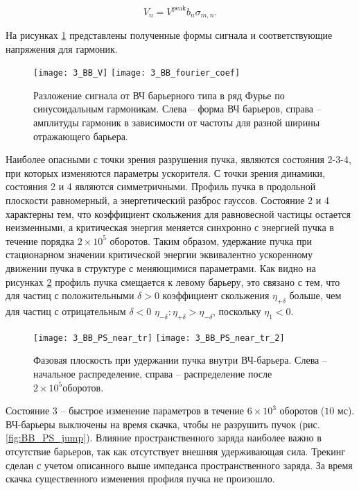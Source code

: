 \begin{equation}
V_n=V^{\textrm{peak}}b_n\sigma_{m, n}.
\label{Volt_n}
\end{equation}

\noindent На рисунках \ref{fig:wave} представлены полученные формы сигнала и со\-от\-вет\-ству\-ющ\-ие напряжения для гармоник.

\begin{figure}[!h]
   \texttt{[image: 3\_BB\_V]}
   \texttt{[image: 3\_BB\_fourier\_coef]}
   \caption{Разложение сигнала от ВЧ барьерного типа в ряд Фурье по синусоидальным гармоникам. Слева – форма 
   ВЧ барьеров, справа – амплитуды гармоник в зависимости от частоты для разной ширины отражающего барьера.}
   \label{fig:wave}
\end{figure}

\par Наиболее опасными с точки зрения разрушения пучка, являются со\-сто\-я\-ния 2-3-4, при которых изменяются параметры ускорителя. С точки зрения динамики, состояния 2 и 4 являются симметричными. Профиль пучка в продольной плоскости равномерный, а э\-нер\-ге\-ти\-чес\-кий разброс гауссов. Состояние 2 и 4 характерны тем, что коэффициент скольжения для равновесной частицы остается неизменными, а кри\-ти\-чес\-кая энергия меняется синхронно с энергией пучка в течение порядка $2\times{10}^5$ оборотов. Таким образом, удержание пучка при стационарном значении критической энергии эквивалентно ускоренному движении пуч\-ка в структуре с меняющимися параметрами. Как видно на рисунках \ref{fig:BB_PS_near_tr} профиль пучка смещается к левому барьеру, это связано с тем, что для частиц с положительными $\delta>0$ коэффициент скольжения $\eta_{+\delta}$ больше, чем для частиц с отрицательным $\delta<0$ $\eta_{-\delta}: \eta_{+\delta}>\eta_{-\delta}$, поскольку $\eta_1<0$. 

\begin{figure}
   \texttt{[image: 3\_BB\_PS\_near\_tr]}
   \texttt{[image: 3\_BB\_PS\_near\_tr\_2]}
   \caption{Фазовая плоскость при удержании пучка внутри ВЧ-барьера. Слева – начальное распределение, справа – распределение после $2\times{10}^5 оборотов$.}
   \label{fig:BB_PS_near_tr}
\end{figure}

\par Состояние 3 – быстрое изменение параметров в течение $6\times{10}^3$ о\-бо\-ро\-тов ($10$ мс). ВЧ-барьеры выключены на время скачка, чтобы не разрушить пучок (рис. \ref{fig:BB_PS_jump}).  Влияние пространственного заряда наиболее важно в отсутствие барь\-е\-ров, так как отсутствует внешняя удерживающая сила. Трекинг сделан с учетом описанного выше импеданса пространственного заряда. За время скачка существенного изменения профиля пучка не про\-и\-зош\-ло.

